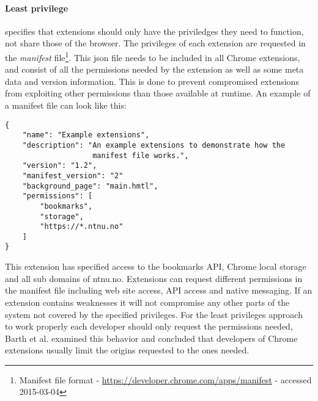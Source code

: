 \paragraph{Least privilege} specifies that extensions should only have the priviledges they need to function, not share those of the browser. The privileges of each extension are requested in the \emph{manifest} file\footnote{Manifest file format - \url{https://developer.chrome.com/apps/manifest} - accessed 2015-03-04}. This json file needs to be included in all Chrome extensions, and consist of all the permissions needed by the extension as well as some meta data and version information. This is done to prevent compromised extensions from exploiting other permissions than those available at runtime. An example of a manifest file can look like this: 

\begin{verbatim}
{
    "name": "Example extensions",
    "description": "An example extensions to demonstrate how the
                    manifest file works.",
    "version": "1.2",
    "manifest_version": "2"
    "background_page": "main.hmtl",
    "permissions": [
        "bookmarks",
        "storage",
        "https://*.ntnu.no"
    ]
}
\end{verbatim}
This extension has specified access to the bookmarks API, Chrome local storage and all sub domains of ntnu.no. Extensions can request different permissions in the manifest file including web site access, API access and native messaging. If an extension contains weaknesses it will not compromise any other parts of the system not covered by the specified privileges. For the least privileges approach to work properly each developer should only request the permissions needed, Barth et al. \cite{protecting-browsers} examined this behavior and concluded that developers of Chrome extensions usually limit the origins requested to the ones needed. 

